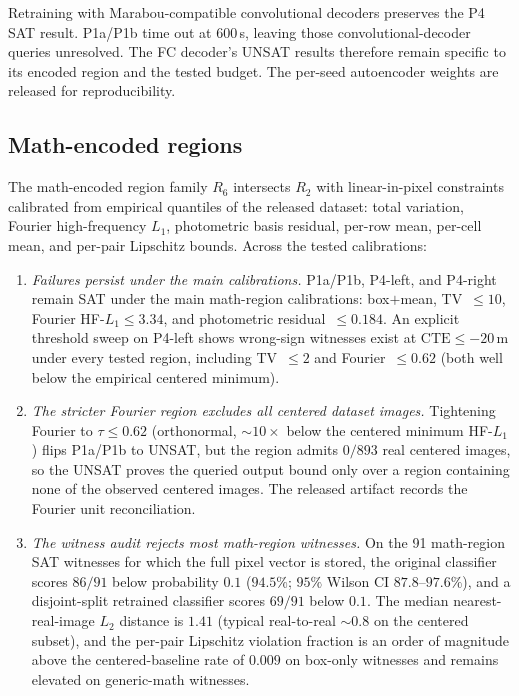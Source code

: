 \documentclass[twocolumn,smallextended,runningheads]{svjour3}
\begin{document}
Retraining with Marabou-compatible convolutional decoders preserves the P4 SAT result. P1a/P1b time out at $600$\,s, leaving those convolutional-decoder queries unresolved. The FC decoder's UNSAT results therefore remain specific to its encoded region and the tested budget. The per-seed autoencoder weights are released for reproducibility.

\subsection{Math-encoded regions}
\label{sec:math_regions}

The math-encoded region family $R_6$ intersects $R_2$ with linear-in-pixel constraints calibrated from empirical quantiles of the released dataset: total variation, Fourier high-frequency $L_1$, photometric basis residual, per-row mean, per-cell mean, and per-pair Lipschitz bounds. Across the tested calibrations:

\begin{enumerate}[nosep]
  \item \emph{Failures persist under the main calibrations.} P1a/P1b, P4-left, and P4-right remain SAT under the main math-region calibrations: box$+$mean, TV~$\le 10$, Fourier HF-$L_1\le 3.34$, and photometric residual~$\le 0.184$. An explicit threshold sweep on P4-left shows wrong-sign witnesses exist at $\text{CTE}\le -20$\,m under every tested region, including TV~$\le 2$ and Fourier~$\le 0.62$ (both well below the empirical centered minimum).
  \item \emph{The stricter Fourier region excludes all centered dataset images.} Tightening Fourier to $\tau\le 0.62$ (orthonormal, $\sim 10\times$ below the centered minimum HF-$L_1$) flips P1a/P1b to UNSAT, but the region admits $0/893$ real centered images, so the UNSAT proves the queried output bound only over a region containing none of the observed centered images. The released artifact records the Fourier unit reconciliation.
  \item \emph{The witness audit rejects most math-region witnesses.} On the 91 math-region SAT witnesses for which the full pixel vector is stored, the original classifier scores $86/91$ below probability $0.1$ ($94.5\%$; $95\%$ Wilson CI $87.8$--$97.6\%$), and a disjoint-split retrained classifier scores $69/91$ below $0.1$. The median nearest-real-image $L_2$ distance is $1.41$ (typical real-to-real $\sim 0.8$ on the centered subset), and the per-pair Lipschitz violation fraction is an order of magnitude above the centered-baseline rate of $0.009$ on box-only witnesses and remains elevated on generic-math witnesses.
\end{enumerate}
\end{document}
